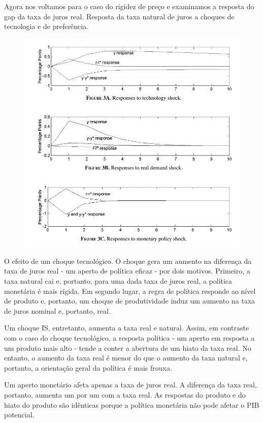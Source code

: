 Agora nos voltamos para o caso do rigidez de preço e examinamos a resposta do gap da taxa de juros real. Resposta da taxa natural de juros a choques de tecnologia e de preferência.

\begin{figure}[H]
\centering
\includegraphics[scale=0.60]{Figuras/Figura Neiss2.jpg}
\end{figure}

O efeito de um choque tecnológico. O choque gera um aumento na diferença da taxa de juros real - um aperto de política eficaz - por dois motivos. Primeiro, a taxa natural cai e, portanto, para uma dada taxa de juros real, a política monetária é mais rígida. Em segundo lugar, a regra de política responde ao nível de produto e, portanto, um choque de produtividade induz um aumento na taxa de juros nominal e, portanto, real.

Um choque IS, entretanto, aumenta a taxa real e natural. Assim, em contraste com o caso do choque tecnológico, a resposta política - um aperto em resposta a um produto mais alto - tende a conter a abertura de um hiato da taxa real. No entanto, o aumento da taxa real é menor do que o aumento da taxa natural e, portanto, a orientação geral da política é mais frouxa.

Um aperto monetário afeta apenas a taxa de juros real. A diferença da taxa real, portanto, aumenta um por um com a taxa real. As respostas do produto e do hiato do produto são idênticas porque a política monetária não pode afetar o PIB potencial.

